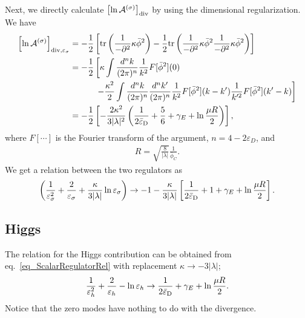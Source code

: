 \documentclass[12pt]{article}
\begin{document}
Next, we directly calculate $\left[\ln\mathcal A^{(\sigma)}\right]_{\rm
div}$ by using the dimensional regularization. We have
\begin{align}
 \left[
  \ln\mathcal A^{(\sigma)}
 \right]_{{\rm div},\varepsilon_{\sigma}}
  & = -\frac{1}{2}
 \left[
  {\rm tr}
  \left(
   \frac{1}{-\partial^2}\kappa\bar\phi^2
  \right)-\frac{1}{2}{\rm tr}
  \left(
   \frac{1}{-\partial^2}\kappa\bar\phi^2\frac{1}{-\partial^2}\kappa\bar\phi^2
  \right)
 \right]\nonumber                                                              \\
  & = -\frac{1}{2}
 \left[
  \kappa\int\frac{d^nk}{(2\pi)^n}\frac{1}{k^2}F[\bar\phi^2](0)\right.\nonumber \\
  & \hspace{7ex}\left.-\frac{\kappa^2}{2}
  \int\frac{d^nk}{(2\pi)^n}\frac{d^nk'}{(2\pi)^n}
  \frac{1}{k^2}F[\bar\phi^2](k-k')\frac{1}{k'^2}F[\bar\phi^2](k'-k)
 \right]\nonumber                                                              \\
  & = -\frac{1}{2}
 \left[
  -\frac{2\kappa^2}{3|\lambda|^2}
  \left(
   \frac{1}{2\bar{\varepsilon}_{\rm D}}+\frac{5}{6}+\gamma_E+\ln\frac{\mu R}{2}
  \right)
 \right],
\end{align}
where $F[\cdots]$ is the Fourier transform of the argument,
$n=4-2\varepsilon_D$, and
\begin{align}
 R = \sqrt{\frac{8}{|\lambda|}}\frac{1}{\bar\phi_C}.
\end{align}
We get a relation between the two regulators as
\begin{align}
 \left(
  \frac{1}{\varepsilon_{\sigma}^2}+\frac{2}{\varepsilon_{\sigma}}
  +\frac{\kappa}{3|\lambda|}\ln\varepsilon_{\sigma}\right)
 \to -1-\frac{\kappa}{3|\lambda|}
 \left[
  \frac{1}{2\bar{\varepsilon}_{\rm D}}+1+\gamma_E+\ln\frac{\mu R}{2}
 \right].
 \label{eq_ScalarRegulatorRel}
\end{align}

\subsection{Higgs}

The relation for the Higgs contribution can be obtained from
eq.~\eqref{eq_ScalarRegulatorRel} with replacement
$\kappa\to-3|\lambda|$;
\begin{align}
 \frac{1}{\varepsilon_{h}^2}+\frac{2}{\varepsilon_{h}}
 -\ln\varepsilon_{h}\to\frac{1}{2\bar{\varepsilon}_{\rm D}}+\gamma_E+\ln\frac{\mu R}{2}.
\end{align}
Notice that the zero modes have nothing to do with the divergence.
\end{document}

